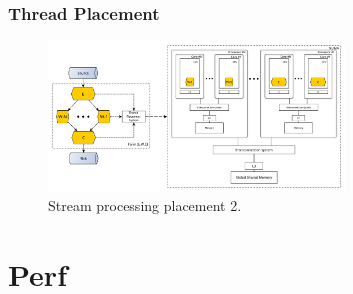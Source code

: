 \documentclass[aspectratio=169]{beamer}
\begin{document}
\begin{frame}
	\frametitle{Thread Placement}

	\begin{figure}
        \includegraphics[width=0.7\textwidth,keepaspectratio]{./images/proposed-approach-placement-2.pdf}
		\caption{Stream processing placement 2.}
	\end{figure}
\end{frame}

\section{Perf}
\end{document}
